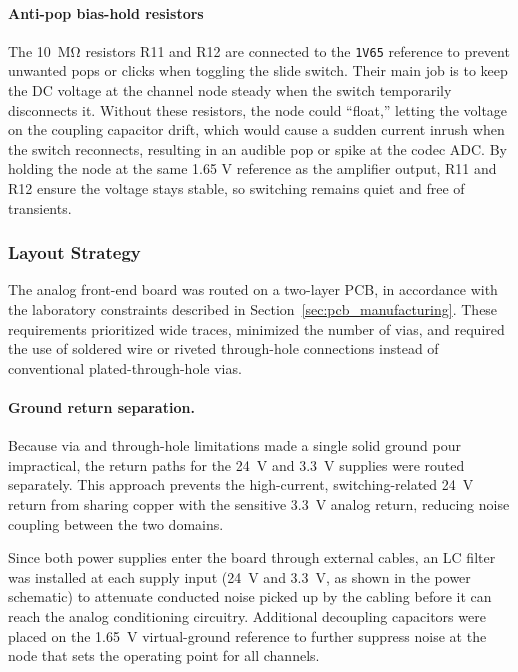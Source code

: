 \paragraph{Anti-pop bias-hold resistors}
The \SI{10}{\mega\ohm} resistors R11 and R12 are connected to the \texttt{1V65} reference to prevent unwanted pops or clicks when toggling the slide switch. Their main job is to keep the DC voltage at the channel node steady when the switch temporarily disconnects it. Without these resistors, the node could “float,” letting the voltage on the coupling capacitor drift, which would cause a sudden current inrush when the switch reconnects, resulting in an audible pop or spike at the codec ADC. By holding the node at the same 1.65 V reference as the amplifier output, R11 and R12 ensure the voltage stays stable, so switching remains quiet and free of transients.

\subsubsection{Layout Strategy}
\label{sec:afe_layout}

The analog front-end board was routed on a two-layer PCB, in accordance with the laboratory constraints described in Section~\ref{sec:pcb_manufacturing}. These requirements prioritized wide traces, minimized the number of vias, and required the use of soldered wire or riveted through-hole connections instead of conventional plated-through-hole vias.

\paragraph{Ground return separation.}
Because via and through-hole limitations made a single solid ground pour impractical, the return paths for the \SI{24}{\volt} and \SI{3.3}{\volt} supplies were routed separately. This approach prevents the high-current, switching-related \SI{24}{\volt} return from sharing copper with the sensitive \SI{3.3}{\volt} analog return, reducing noise coupling between the two domains.

Since both power supplies enter the board through external cables, an LC filter was installed at each supply input (\SI{24}{\volt} and \SI{3.3}{\volt}, as shown in the power schematic) to attenuate conducted noise picked up by the cabling before it can reach the analog conditioning circuitry. Additional decoupling capacitors were placed on the \SI{1.65}{\volt} virtual-ground reference to further suppress noise at the node that sets the operating point for all channels.

